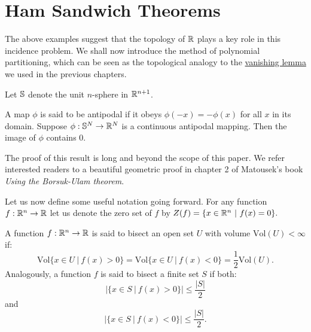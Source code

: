 \section{Ham Sandwich Theorems}
The above examples suggest that the topology of $\mathbb R$ plays a key role in this incidence problem. We shall now introduce the method of polynomial partitioning,
which can be seen as the topological analogy to the \hyperref[kaklem2]{vanishing lemma} we used in the previous chapters. 

Let $\mathbb S$ denote the unit $n$-sphere in $\mathbb R^{n+1}$. 
\begin{theorem}
    A map $\phi$ is said to be antipodal if it obeys $\phi (-x) = -\phi(x)$ for all $x$ in its domain. Suppose $\phi: \mathbb S^N \to \mathbb R^N$ is a continuous antipodal mapping. 
    Then the image of $\phi$ contains 0. 
    \label{thm:Borsuk-Ulam}
\end{theorem}
The proof of this result is long and beyond the scope of this paper. We refer interested readers to a beautiful geometric proof in chapter 2 of Matousek's book \textit{Using the Borsuk-Ulam theorem}.\cite{matouvsek2003using}

Let us now define some useful notation going forward. 
For any function $f : \mathbb R^n \to \mathbb R$ let us denote the zero set of $f$ by $Z(f) = \{x \in \mathbb R^n \ | \ f(x) = 0\}.$
\begin{definition}
A function $f :\mathbb R^n \to \mathbb R$ is said to bisect an open set $U$ with volume $\text{Vol}(U) < \infty$ if:
\[
    \text{Vol}\{x \in U \ | \ f(x) > 0 \} = \text{Vol}\{x \in U \ | \ f(x) < 0 \} = \frac{1}{2} \text{Vol}(U).
\]
Analogously, a function $f$ is said to bisect a finite set $S$ if both:
\[
  |\{x \in S \ | \ f(x) > 0\}| \leq \frac{|S|}{2}   
\]
and 
\[
  |\{x \in S \ | \ f(x) < 0\}| \leq \frac{|S|}{2}.
\]

\end{definition}


